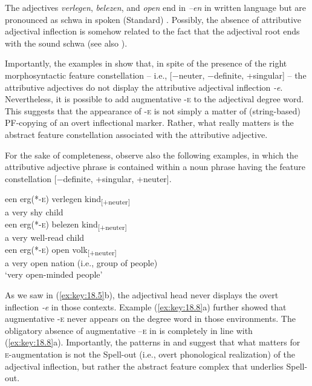 \documentclass[output=paper]{langsci/langscibook}
\begin{document}
The adjectives \emph{verlegen}, \emph{belezen}, and \emph{open} end in
\emph{–en} in written language but are pronounced as schwa in spoken (Standard)
. Possibly, the absence of attributive adjectival inflection is
somehow related to the fact that the adjectival root ends with the sound schwa
(see also \citealt{Broekhuis2013}).

Importantly, the examples in  show that, in spite of the
presence of the right morphosyntactic feature constellation – i.e., [−neuter,
−definite, +singular] – the attributive adjectives do not display the
attributive adjectival inflection \emph{-e}. Nevertheless, it is possible to
add augmentative \textsc{-e} to the adjectival degree word.
This suggests that the appearance of \textsc{-e} is not simply a matter of
(string-based) \gls{PF}-copying of an overt inflectional marker. Rather, what
really matters is the abstract feature constellation associated with the
attributive adjective.

For the sake of completeness, observe also the following examples, in which the
attributive adjective phrase is contained within a noun phrase having the
feature constellation [−definite, +singular, +neuter].

\ea%
    \label{ex:key:18.23}
	\ea
	\gll een  erg(*-\textsc{e})    verlegen    kind\textsubscript{[+neuter]}\\
		 a        very            shy              child\\
	\ex
	\gll een  erg(*-\textsc{e})    belezen      kind\textsubscript{[+neuter]}\\
		a        very          well-read  child\\
	\ex
	\gll een  erg(*-\textsc{e})    open  volk\textsubscript{[+neuter]}\\
		a        very          open  nation (i.e., group of people)\\
	\glt \enquote*{very open-minded people}
	\z
\z

As we saw in (\ref{ex:key:18.5}b), the adjectival head never displays the overt
inflection \emph{‑e} in those contexts. Example (\ref{ex:key:18.8}a) further showed
that augmentative -\textsc{e} never appears on the degree word in those
environments. The obligatory absence of augmentative –\textsc{e} in
 is completely in line with (\ref{ex:key:18.8}a). Importantly, the
patterns in  and  suggest that what matters for
\textsc{e}-augmentation is not the Spell-out (i.e., overt phonological
realization) of the adjectival inflection, but rather the abstract feature
complex that underlies Spell-out.
\end{document}
